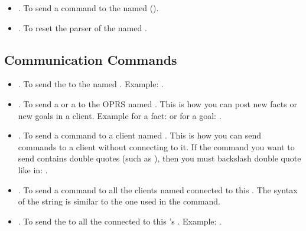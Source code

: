 \begin{itemize}
\item {}. To send a  command
to the \CPK{} named  ().

\item {}. To reset the parser of the
\CPK{} named .

\end{itemize}

\subsection{\OPRSS{} Communication Commands}

\begin{itemize}

\item {}. To send the  to the
\COPRS{} named . \*
Example: .

\item {}. To send a  or a
 to the OPRS named . This is how you can post new facts
or new goals in a \COPRS{} client. \*
Example for a fact:  or for a goal: .

\item {}. To send a  command
to a \COPRS{} client named . This is how you can send commands to a
\COPRS{} client without connecting to it. If the command you want to send
contains double quotes (such as ), then you
must backslash double quote like in: .

\item {}. To send a  command
to all the \CPK{} clients named connected to this \OPRSS{}. The syntax of the
string is similar to the one used in the  command.

\item {}. To send the  to
all the \COPRS{} connected to this \OPRSS{}'s \MPA{}. \*
Example: .

\end{itemize}

